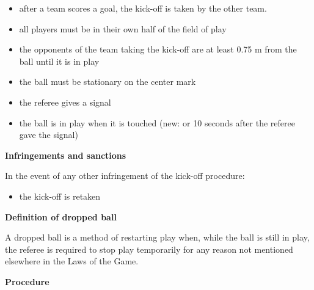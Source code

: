 \begin{itemize}
\item after a team scores a goal, the kick-off is taken by the other team. 
\item all players must be in their own half of the field of play 
\item the opponents of the team taking the kick-off are at least 0.75 m from the ball until it is in play 
\item the ball must be stationary on the center mark
\item the referee gives a signal
\item the ball is in play when it is touched  (new: or 10 seconds after the referee gave the signal)
\end{itemize}

{\bfseries Infringements and sanctions}

\headlinebox


In the event of any other infringement of the kick-off procedure: 

\begin{itemize}
\item the kick-off is retaken
\end{itemize}


{\bfseries Definition of dropped ball}

\headlinebox

A dropped ball is a method of restarting play when, while the ball is still in play, the referee is required to stop play temporarily for any reason not mentioned elsewhere in the Laws of the Game. 

\bigskip

{\bfseries Procedure}

